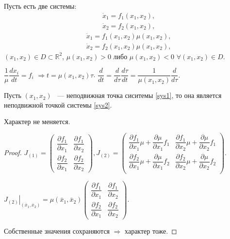 Пусть есть две системы:
\begin{equation} \label{sys1}
\begin{split}
    & \dot{x}_1 = f_1(x_1, x_2), {} \\
    & \dot{x}_2 = f_2(x_1, x_2),
\end{split}
\end{equation} 
\begin{equation} \label{sys2}
\begin{split}
    & \dot{x}_1 = f_1(x_1, x_2) \mu(x_1, x_2), {} \\
    & \dot{x}_2 = f_2(x_1, x_2) \mu(x_1, x_2),
\end{split}
\end{equation}
\( (x_1, x_2) \in D \subset \mathbb{R}^2 \), \( \mu(x_1, x_2) > 0 \) либо \( \mu(x_1, x_2) < 0 \) \( \forall (x_1, x_2) \in D \).

\( \dfrac{1}{\mu} \dfrac{dx_i}{dt} = f_i \) \( \Rightarrow t = \mu(x_1, x_2) \tau \). \( \dfrac{d}{dt} = \dfrac{d}{d\tau} \dfrac{d\tau}{dt} = \dfrac{1}{\mu(x_1, x_2)} \dfrac{d}{d\tau}. \)

\begin{proposition}
    Пусть \( (x_1, x_2) \) ~--- неподвижная точка сиситемы \ref{sys1}, то она является неподвижной точкой системы \ref{sys2}.
\end{proposition}

\begin{proposition}
    Характер не меняется.
\end{proposition}

\begin{proof}
    \( J_{(1)} = \begin{pmatrix}
        \dfrac{\partial f_1}{\partial x_1} & \dfrac{\partial f_1}{\partial x_2} \\
        \dfrac{\partial f_2}{\partial x_1} & \dfrac{\partial f_2}{\partial x_2}
    \end{pmatrix}, 
    J_{(2)} = \begin{pmatrix}
        \dfrac{\partial f_1}{\partial x_1} \mu + \dfrac{\partial \mu}{\partial x_1} f_1 & \dfrac{\partial f_1}{\partial x_2} \mu + \dfrac{\partial \mu}{\partial x_2} f_1 \\
        \dfrac{\partial f_2}{\partial x_1} \mu + \dfrac{\partial \mu}{\partial x_1} f_2 & \dfrac{\partial f_2}{\partial x_2} \mu + \dfrac{\partial \mu}{\partial x_2} f_2 \\
    \end{pmatrix} \).
    
    \( \left. J_{(2)} \right\vert_{(\bar{x}_1, \bar{x}_2)} = \mu(\bar{x}_1, \bar{x}_2)
    \begin{pmatrix}
        \dfrac{\partial f_1}{\partial x_1} & \dfrac{\partial f_1}{\partial x_2} \\
        \dfrac{\partial f_2}{\partial x_1} & \dfrac{\partial f_2}{\partial x_2}
    \end{pmatrix} \).
    
    Собственные значения сохраняются \( \Rightarrow \) характер тоже.
\end{proof}

